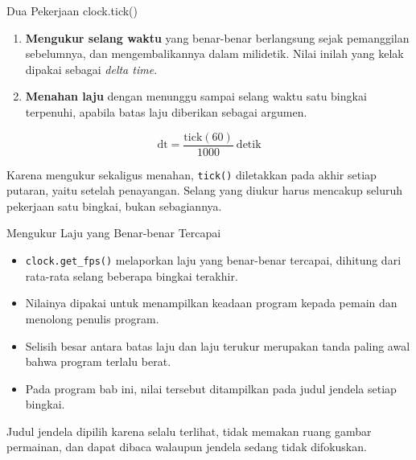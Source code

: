 \documentclass[aspectratio=169,10pt]{beamer}
\begin{document}
\begin{frame}{Dua Pekerjaan clock.tick()}
\begin{enumerate}
  \item \textbf{Mengukur selang waktu} yang benar-benar berlangsung sejak
        pemanggilan sebelumnya, dan mengembalikannya dalam milidetik. Nilai
        inilah yang kelak dipakai sebagai \emph{delta time}.
  \item \textbf{Menahan laju} dengan menunggu sampai selang waktu satu bingkai
        terpenuhi, apabila batas laju diberikan sebagai argumen.
\end{enumerate}
\[
  \mathrm{dt} = \frac{\mathrm{tick}(60)}{1000}\ \text{detik}
\]
\begin{kotak}
Karena mengukur sekaligus menahan, \texttt{tick()} diletakkan pada akhir
setiap putaran, yaitu setelah penayangan. Selang yang diukur harus mencakup
seluruh pekerjaan satu bingkai, bukan sebagiannya.
\end{kotak}
\end{frame}

\begin{frame}{Mengukur Laju yang Benar-benar Tercapai}
\begin{itemize}
  \item \texttt{clock.get\_fps()} melaporkan laju yang benar-benar tercapai,
        dihitung dari rata-rata selang beberapa bingkai terakhir.
  \item Nilainya dipakai untuk menampilkan keadaan program kepada pemain dan
        menolong penulis program.
  \item Selisih besar antara batas laju dan laju terukur merupakan tanda
        paling awal bahwa program terlalu berat.
  \item Pada program bab ini, nilai tersebut ditampilkan pada judul jendela
        setiap bingkai.
\end{itemize}
\begin{kotak}
Judul jendela dipilih karena selalu terlihat, tidak memakan ruang gambar
permainan, dan dapat dibaca walaupun jendela sedang tidak difokuskan.
\end{kotak}
\end{frame}
\end{document}

